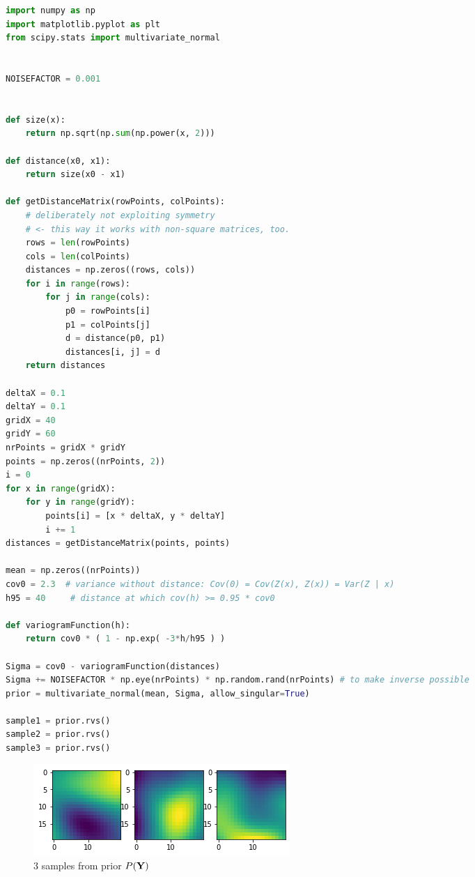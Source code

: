 \begin{lstlisting}[language=python]
import numpy as np
import matplotlib.pyplot as plt
from scipy.stats import multivariate_normal


NOISEFACTOR = 0.001


def size(x):
    return np.sqrt(np.sum(np.power(x, 2)))

def distance(x0, x1):
    return size(x0 - x1)

def getDistanceMatrix(rowPoints, colPoints):
    # deliberately not exploiting symmetry 
    # <- this way it works with non-square matrices, too.
    rows = len(rowPoints)
    cols = len(colPoints)
    distances = np.zeros((rows, cols))
    for i in range(rows):
        for j in range(cols): 
            p0 = rowPoints[i]
            p1 = colPoints[j]
            d = distance(p0, p1)
            distances[i, j] = d
    return distances

deltaX = 0.1
deltaY = 0.1
gridX = 40
gridY = 60
nrPoints = gridX * gridY
points = np.zeros((nrPoints, 2))
i = 0
for x in range(gridX):
    for y in range(gridY):
        points[i] = [x * deltaX, y * deltaY]
        i += 1
distances = getDistanceMatrix(points, points)

mean = np.zeros((nrPoints))
cov0 = 2.3  # variance without distance: Cov(0) = Cov(Z(x), Z(x)) = Var(Z | x)
h95 = 40     # distance at which cov(h) >= 0.95 * cov0

def variogramFunction(h):
    return cov0 * ( 1 - np.exp( -3*h/h95 ) )

Sigma = cov0 - variogramFunction(distances)
Sigma += NOISEFACTOR * np.eye(nrPoints) * np.random.rand(nrPoints) # to make inverse possible
prior = multivariate_normal(mean, Sigma, allow_singular=True)

sample1 = prior.rvs()
sample2 = prior.rvs()
sample3 = prior.rvs()
\end{lstlisting}

\begin{figure}[H]
    \caption{3 samples from prior $P(\mathbf{Y})$}
    \centering
    \includegraphics[width=0.7\linewidth]{images/gp_prior_samples.png}
\end{figure}

